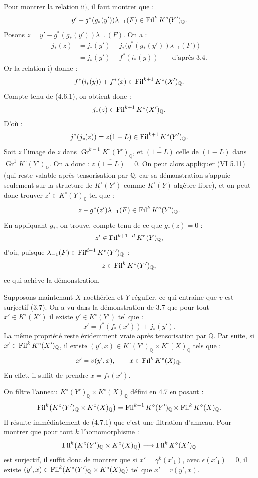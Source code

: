 Pour montrer la relation ii), il faut montrer que :
\[
  y'-g^*(g_*(y'))\lambda_{-1}(F)\in\operatorname{Fil}^kK^\circ(Y')_{\mathbb Q}.
\]
Posons \(z=y'-g^*(g_*(y'))\lambda_{-1}(F)\). On a :
\[
\begin{aligned}
j_*(z)
  &=j_*(y')-j_*\bigl(g^*(g_*(y'))\lambda_{-1}(F)\bigr)\\
  &=j_*(y')-f^*(i_*(y))\qquad\text{d'après 3.4.}
\end{aligned}
\]
Or la relation i) donne :
\[
  f^*(i_*(y))+f^*(x)\in\operatorname{Fil}^{k+1}K^\circ(X')_{\mathbb Q}.
\]
Compte tenu de (4.6.1), on obtient donc :
\[
  j_*(z)\in\operatorname{Fil}^{k+1}K^\circ(X')_{\mathbb Q}.
\]
D'où :
\[
  j^*(j_*(z))=z(1-L)\in\operatorname{Fil}^{k+1}K^\circ(Y')_{\mathbb Q}.
\]
Soit \(\bar z\) l'image de \(z\) dans \(\operatorname{Gr}^{k-1}K^\circ(Y')_{\mathbb Q}\), et \(\overline{(1-L)}\) celle de \((1-L)\) dans \(\operatorname{Gr}^{1}K^\circ(Y')_{\mathbb Q}\). On a donc : \(\bar z\,\overline{(1-L)}=0\). On peut alors appliquer (VI 5.11) (qui reste valable après tensorisation par \(\mathbb Q\), car sa démonstration s'appuie seulement sur la structure de \(K^\circ(Y')\) comme \(K^\circ(Y)\)-algèbre libre), et on peut donc trouver \(z'\in K^\circ(Y)_{\mathbb Q}\) tel que :
\[
  z-g^*(z')\lambda_{-1}(F)\in\operatorname{Fil}^kK^\circ(Y')_{\mathbb Q}.
\]
En appliquant \(g_*\), on trouve, compte tenu de ce que \(g_*(z)=0\) :
\[
  z'\in\operatorname{Fil}^{k+1-d}K^\circ(Y)_{\mathbb Q},
\]
d'où, puisque \(\lambda_{-1}(F)\in\operatorname{Fil}^{d-1}K^\circ(Y')_{\mathbb Q}\) :
\[
  z\in\operatorname{Fil}^kK^\circ(Y')_{\mathbb Q},
\]
ce qui achève la démonstration.

Supposons maintenant \(X\) noethérien et \(Y\) régulier, ce qui entraine que \(v\) est surjectif (3.7). On a vu dans la démonstration de 3.7 que pour tout \(x'\in K^\circ(X')\) il existe \(y'\in K^\circ(Y')\) tel que :
\[
  x'=f^*(f_*(x'))+j_*(y').
\]
La même propriété reste évidemment vraie après tensorisation par \(\mathbb Q\). Par suite, si \(x'\in\operatorname{Fil}^kK^\circ(X')_{\mathbb Q}\), il existe \((y',x)\in K^\circ(Y')_{\mathbb Q}\times K^\circ(X)_{\mathbb Q}\) tels que :
\[
  x'=v(y',x),\qquad x\in\operatorname{Fil}^kK^\circ(X)_{\mathbb Q}.
\]
En effet, il suffit de prendre \(x=f_*(x')\).

On filtre l'anneau \(K^\circ(Y')_{\mathbb Q}\times K^\circ(X)_{\mathbb Q}\) défini en 4.7 en posant :
\[
  \operatorname{Fil}^k\bigl(K^\circ(Y')_{\mathbb Q}\times K^\circ(X)_{\mathbb Q}\bigr)
  =
  \operatorname{Fil}^{k-1}K^\circ(Y')_{\mathbb Q}\times \operatorname{Fil}^kK^\circ(X)_{\mathbb Q}.
\]
Il résulte immédiatement de (4.7.1) que c'est une filtration d'anneau. Pour montrer que pour tout \(k\) l'homomorphisme :
\[
  \operatorname{Fil}^k\bigl(K^\circ(Y')_{\mathbb Q}\times K^\circ(X)_{\mathbb Q}\bigr)
  \longrightarrow
  \operatorname{Fil}^kK^\circ(X')_{\mathbb Q}
\]
est surjectif, il suffit donc de montrer que si \(x'= \gamma^k(x'_1)\), avec \(\epsilon(x'_1)=0\), il existe \((y',x)\in\operatorname{Fil}^k(K^\circ(Y')_{\mathbb Q}\times K^\circ(X)_{\mathbb Q})\) tel que \(x'=v(y',x)\).

